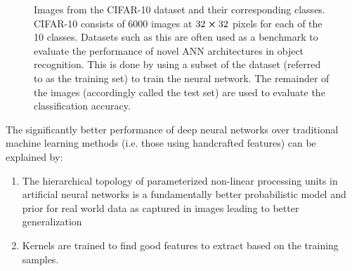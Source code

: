 \begin{figure}[H]
    \centering
{}
\caption[CIFAR-10 classes and sample images]{Images from the CIFAR-10 \cite{cifar10} dataset and their corresponding classes. CIFAR-10 consists of 6000 images at $32\cross 32$ pixels for each of the 10 classes. Datasets such as this are often used as a benchmark to evaluate the performance of novel ANN architectures in object recognition. This is done by using a subset of the dataset (referred to as the training set) to train the neural network. The remainder of the images (accordingly called the test set) are used to evaluate the classification accuracy.}\label{fig:cifar10}
\end{figure}\noindent
The significantly better performance of deep neural networks over traditional machine learning methods (i.e. those using handcrafted features) can be explained by: 
\begin{enumerate}
    \item The hierarchical topology of parameterized non-linear processing units in artificial neural networks is a fundamentally better probabilistic model and prior for real world data as captured in images leading to better generalization
    \item Kernels are trained to find good features to extract based on the training samples.
\end{enumerate}
